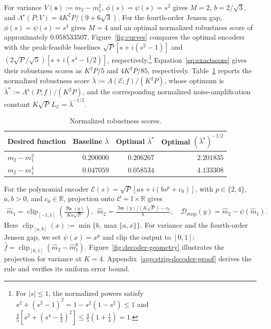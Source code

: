 \documentclass[journal,12pt,onecolumn,draftclsnofoot]{IEEEtran}
\newcommand{\enc}{\mathscr{E}}\newcommand{\dec}{\mathscr{D}}\newcommand{\R}{\mathbb R}\newcommand{\C}{\mathbb C}
\renewcommand{\Re}{\mathop{\mathfrak{Re}}\nolimits}
\renewcommand{\Im}{\mathop{\mathfrak{Im}}\nolimits}
\begin{document}
For variance $V(\boldsymbol s):=m_2-m_1^2$,
$\phi(s)=\psi(s)=s^2$ gives $M=2$,
$b=2/\sqrt3$, and
$\Lambda^\star(P;V)=4K^2P/(9+6\sqrt3)$.
For the fourth-order Jensen gap, $\phi(s)=\psi(s)=s^4$ gives
$M=4$ and an optimal normalized robustness score of approximately
$0.058533507$.
Figure~\ref{fig:curves} compares the optimal encoders with the
peak-feasible baselines $\sqrt P[s+i(s^2-1)]$ and
$(2\sqrt P/\sqrt5)[s+i(s^4-1/2)]$, respectively.\footnote{For
$|s|\le1$, the normalized powers satisfy
$s^2+(s^2-1)^2=1-s^2(1-s^2)\le1$ and
$\frac45[s^2+(s^4-\frac12)^2]
\le\frac45(1+\frac14)=1$.}
Equation~\eqref{eq:exactscore} gives their robustness scores
as $K^2P/5$ and $4K^2P/85$, respectively. Table~\ref{tab:values} reports the normalized robustness score
$\bar\lambda:=\Lambda(\enc;f)/(K^2P)$, whose optimum is
$\bar\lambda^\star:=\Lambda^\star(P;f)/(K^2P)$, and the corresponding
normalized noise-amplification constant
$K\sqrt P\,L_\enc=\bar\lambda^{-1/2}$.




\begin{table}[t]\caption{Normalized robustness scores.}\label{tab:values}
\centering\small\begin{tabular}{@{}lrrr@{}}\toprule
Desired function & Baseline $\bar\lambda$ & Optimal $\bar\lambda^\star$ & Optimal $(\bar\lambda^\star)^{-1/2}$\\\midrule
$m_2-m_1^2$ & $0.200000$ & $0.206267$ & $2.201835$\\
$m_2-m_1^4$ & $0.047059$ & $0.058534$ & $4.133308$\\
\bottomrule
\end{tabular}\end{table}




For the polynomial encoder
$\enc(s)=\sqrt P[as+i(bs^p+c_0)]$, with $p\in\{2,4\}$,
$a,b>0$, and $c_0\in\R$, projection onto
$\mathcal C=\mathbb I\times\R$ gives
\begin{align}
\hat m_1=\operatorname{clip}_{[-1,1]}
\left(\frac{\Re(y)}{Ka\sqrt P}\right),~~
\hat m_2=\frac{\Im(y)/(K\sqrt P)-c_0}{b},\quad 
\dec_{\mathrm{strip}}(y)=\hat m_2-\psi(\hat m_1). \label{eq:polynomial-decoder}
\end{align}
Here $\operatorname{clip}_{[a,b]}(x):=\min\{b,\max\{a,x\}\}$.
For variance and the fourth-order Jensen gap, we set $\psi(x)=x^p$
and clip the output to $[0,1]$:
$\hat f=\operatorname{clip}_{[0,1]}
(\hat m_2-\hat m_1^p)$.
Figure~\ref{fig:decoder-geometry} illustrates the projection for
variance at $K=4$. Appendix~\ref{app:strip-decoder-proof} derives
the rule and verifies its uniform error bound.
\end{document}
